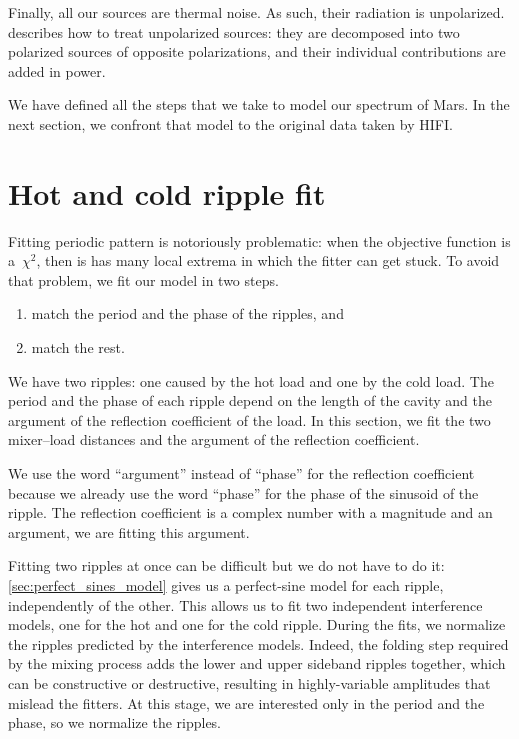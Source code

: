Finally, all our sources are thermal noise.
As such, their radiation is unpolarized.
 describes how to treat unpolarized sources:
they are decomposed into two polarized sources of opposite polarizations, and their individual contributions are added in power.

We have defined all the steps that we take to model our spectrum of Mars.
In the next section, we confront that model to the original data taken by HIFI.





\FloatBarrier



\section{Hot and cold ripple fit}

Fitting periodic pattern is notoriously problematic:
when the objective function is a~$\chi^2$, then is has many local extrema in which the fitter can get stuck.
To avoid that problem, we fit our model in two steps.
\begin{enumerate}
    \item match the period and the phase of the ripples, and
    \item match the rest.
\end{enumerate}
We have two ripples: one caused by the hot load and one by the cold load.
The period and the phase of each ripple depend on the length of the cavity and the argument of the reflection coefficient of the load.
In this section, we fit the two mixer--load distances and the argument of the reflection coefficient.

We use the word ``argument'' instead of ``phase'' for the reflection coefficient because we already use the word ``phase'' for the phase of the sinusoid of the ripple.
The reflection coefficient is a complex number with a magnitude and an argument, we are fitting this argument.

Fitting two ripples at once can be difficult but we do not have to do it:
\cref{sec:perfect_sines_model} gives us a perfect-sine model for each ripple, independently of the other.
This allows us to fit two independent interference models, one for the hot and one for the cold ripple.
During the fits, we normalize the ripples predicted by the interference models.
Indeed, the folding step required by the mixing process adds the lower and upper sideband ripples together, which can be constructive or destructive, resulting in highly-variable amplitudes that mislead the fitters.
At this stage, we are interested only in the period and the phase, so we normalize the ripples.

